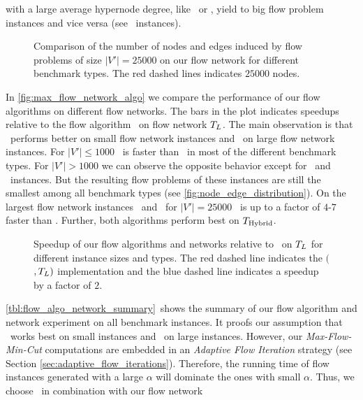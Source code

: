 with a large average  hypernode degree, like \Primal~or \Literal, yield to big flow problem 
instances and vice versa (see \Dual~instances).\\
\begin{figure}[ht!]
\centering
\caption{Comparison of the number of nodes and edges induced by flow problems 
         of size $|V'| = 25000$ on our flow network for different benchmark types.
         The red dashed lines indicates $25000$ nodes.}
\label{fig:node_edge_distribution}
\end{figure} 
In \autoref{fig:max_flow_network_algo} we compare the performance of our flow algorithms on
different flow networks. The bars in the plot indicates speedups relative to the flow algorithm
\EdmondKarp~on flow network $T_L$. The main observation is that \EdmondKarp~performs
better on small flow network instances and \GoldbergTarjan~on large flow network instances. For $|V'| \le 1000$
\EdmondKarp~is faster than \GoldbergTarjan~in most of the different benchmark types. For
$|V'| > 1000$ we can observe the opposite behavior except for \DAC~and \Dual~instances. But the
resulting flow problems of these instances are still the smallest among all benchmark types
(see \autoref{fig:node_edge_distribution}). On the largest flow network instances \Primal~and
\Literal~for $|V'| = 25000$ \GoldbergTarjan~is up to a factor of $4$-$7$ faster than \EdmondKarp.
Further, both algorithms perform best on $T_{\text{Hybrid}}$.
\begin{figure}
\centering
\caption{Speedup of our flow algorithms and networks relative to \EdmondKarp~on
         $T_L$ for different instance sizes and types. The red dashed line indicates the
         $($\EdmondKarp$,T_L)$ implementation and the blue dashed line
         indicates a speedup by a factor of $2$.}
\label{fig:max_flow_network_algo}
\end{figure} 
\autoref{tbl:flow_algo_network_summary}~shows the summary of our flow algorithm and network experiment
on all benchmark instances. It proofs our assumption that \EdmondKarp~works best on small instances
and \GoldbergTarjan~on large instances. However, our \emph{Max-Flow-Min-Cut} computations
are embedded in an \emph{Adaptive Flow Iteration} strategy (see Section \ref{sec:adaptive_flow_iterations}).
Therefore, the running time of flow instances generated with a large $\alpha$ will dominate the
ones with small $\alpha$. Thus, we choose \GoldbergTarjan~in combination with our flow network
